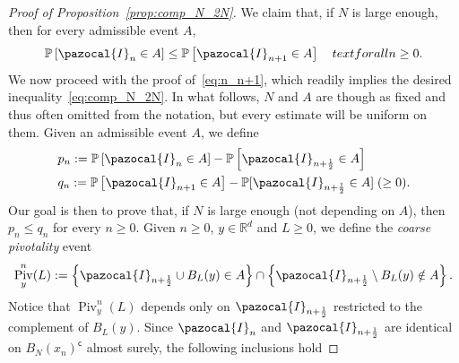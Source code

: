 \documentclass[10pt]{amsart}
\theoremstyle{definition}\newtheorem{defi}[theo]{Definition}\newtheorem{rema}[theo]{Remark}\newtheorem{exam}[theo]{Example}\newtheorem{exem}[theo]{Example}\newtheorem{nota}[theo]{Notation}
\DeclareMathOperator{\Piv}{Piv}
\renewcommand{\P}{\mathbb{P}}
\newcommand{\R}{\mathbb{R}}
\newcommand{\sfc}{\mathsf{c}}
\begin{document}
\begin{proof}[Proof of Proposition~\ref{prop:comp_N_2N}]
We claim that, if $N$ is large enough, then for every admissible event $A$,
\begin{equation}\label{eq:n_n+1}
\P\left[\pazocal{I}_n\in A\right] \leq \P\left[\pazocal{I}_{n+1}\in A\right]\quad text{for all } n\geq0.
\end{equation}
We now proceed with the proof of~\eqref{eq:n_n+1}, which readily implies the desired inequality~\eqref{eq:comp_N_2N}. In what follows, $N$ and $A$ are though as fixed and thus often omitted from the notation, but every estimate will be uniform on them. Given an admissible event $A$, we define
\begin{align}
&p_n:=\P\left[\pazocal{I}_n\in A\right]-\P\left[\pazocal{I}_{n+\frac12}\in A\right]\label{eq:def_p_n}\\
&q_n:=\P\left[\pazocal{I}_{n+1}\in A\right]-\P[\pazocal{I}_{n+\frac12}\in A]\;(\geq0).\label{eq:def_q_n}
\end{align}
Our goal is then to prove that, if $N$ is large enough (not depending on $A$), then $p_n\leq q_n$ for every $n\geq0$. Given $n\geq0$, $y\in\R^d$ and $L\geq0$, we define the \emph{coarse pivotality} event
\begin{equation}\label{eq:piv_def1}
\Piv^{n}_{y}(L):=\left\{\pazocal{I}_{n+\frac12}\cup B_{L}(y) \in A\right\}\cap \left
\{\pazocal{I}_{n+\frac12}\setminus B_{L}(y) \notin A\right\}.
\end{equation}
Notice that $\Piv^{n}_{y}(L)$ depends only on $\pazocal{I}_{n+\frac12}$ restricted to the complement of $B_L(y)$. Since $\pazocal{I}_n$ and $\pazocal{I}_{n+\frac12}$ are identical on $B_{N}(x_n)^{\sfc}$ almost surely, the following inclusions hold


\end{proof}
\end{document}

